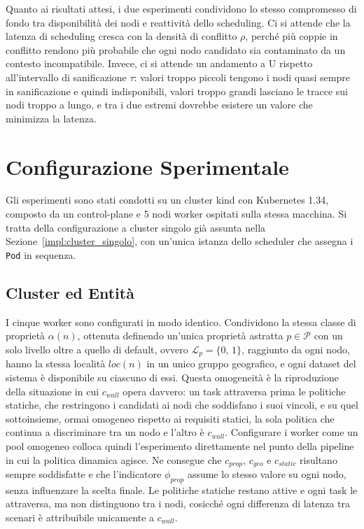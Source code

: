 Quanto ai risultati attesi, i due esperimenti condividono lo stesso compromesso di fondo tra disponibilità dei nodi e reattività dello scheduling. Ci si attende che la latenza di scheduling cresca con la densità di conflitto $\rho$, perché più coppie in conflitto rendono più probabile che ogni nodo candidato sia contaminato da un contesto incompatibile. Invece, ci si attende un andamento a U rispetto all'intervallo di sanificazione $\tau$: valori troppo piccoli tengono i nodi quasi sempre in sanificazione e quindi indisponibili, valori troppo grandi lasciano le tracce sui nodi troppo a lungo, e tra i due estremi dovrebbe esistere un valore che minimizza la latenza. 


\section{Configurazione Sperimentale}
\label{sec:configurazione_sperimentale}

Gli esperimenti sono stati condotti su un cluster kind con Kubernetes 1.34, composto da un control-plane e 5 nodi worker ospitati sulla stessa macchina. Si tratta della configurazione a cluster singolo già assunta nella Sezione~\ref{impl:cluster_singolo}, con un'unica istanza dello scheduler che assegna i \texttt{Pod} in sequenza. 


\subsection{Cluster ed Entità}
\label{subsec:cluster_entita_valutazione}

I cinque worker sono configurati in modo identico. Condividono la stessa classe di proprietà $\alpha(n)$, ottenuta definendo un'unica proprietà astratta $p \in \mathcal{P}$ con un solo livello oltre a quello di default, ovvero $\mathcal{L}_p = \{0,\, 1\}$, raggiunto da ogni nodo, hanno la stessa località $loc(n)$ in un unico gruppo geografico, e ogni dataset del sistema è disponibile su ciascuno di essi. Questa omogeneità è la riproduzione della situazione in cui $c_{wall}$ opera davvero: un task attraversa prima le politiche statiche, che restringono i candidati ai nodi che soddisfano i suoi vincoli, e su quel sottoinsieme, ormai omogeneo rispetto ai requisiti statici, la sola politica che continua a discriminare tra un nodo e l'altro è $c_{wall}$. Configurare i worker come un pool omogeneo colloca quindi l'esperimento direttamente nel punto della pipeline in cui la politica dinamica agisce. Ne consegue che $c_{prop}$, $c_{geo}$ e $c_{static}$ risultano sempre soddisfatte e che l'indicatore $\phi_{prop}$ assume lo stesso valore su ogni nodo, senza influenzare la scelta finale. Le politiche statiche restano attive e ogni task le attraversa, ma non distinguono tra i nodi, cosicché ogni differenza di latenza tra scenari è attribuibile unicamente a $c_{wall}$. 

